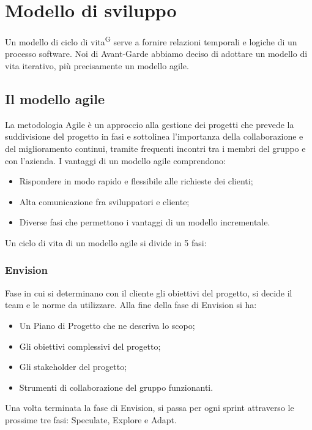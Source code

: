 \newpage
\section{Modello di sviluppo}\label{sec:modello_sviluppo}
Un modello di ciclo di vita\textsuperscript{G} serve a fornire relazioni temporali e logiche di un processo software.
Noi di Avant-Garde abbiamo deciso di adottare un modello di vita iterativo, più precisamente un modello agile.

\subsection{Il modello agile}\label{sec:modello_sviluppo:agile}
La metodologia Agile è un approccio alla gestione dei progetti che prevede la suddivisione del progetto in fasi e sottolinea l'importanza della collaborazione e del miglioramento continui, tramite frequenti incontri tra i membri del gruppo e con l'azienda.
I vantaggi di un modello agile comprendono:
\begin{itemize}
    \item Rispondere in modo rapido e flessibile alle richieste dei clienti;
    \item Alta comunicazione fra sviluppatori e cliente;
    \item Diverse fasi che permettono i vantaggi di un modello incrementale.
\end{itemize}
Un ciclo di vita di un modello agile si divide in 5 fasi:
    \subsubsection{Envision}\label{sec:modello_sviluppo:agile:envision}
    Fase in cui si determinano con il cliente gli obiettivi del progetto, si decide il team e le norme da utilizzare.
    Alla fine della fase di Envision si ha:
    \begin{itemize}
        \item Un Piano di Progetto che ne descriva lo scopo;
        \item Gli obiettivi complessivi del progetto;
        \item Gli stakeholder del progetto;
        \item Strumenti di collaborazione del gruppo funzionanti.
    \end{itemize}
    Una volta terminata la fase di Envision, si passa per ogni sprint attraverso le prossime tre fasi: Speculate, Explore e Adapt.
